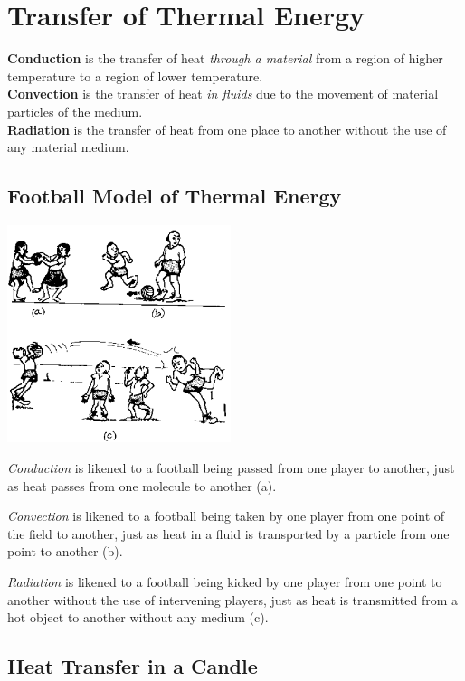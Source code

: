 \section{Transfer of Thermal Energy}

\textbf{Conduction} is the transfer of heat \emph{through a material} from a region of higher temperature to a region of lower temperature.\\
\textbf{Convection} is the transfer of heat \emph{in fluids} due to the movement of material particles of the medium.\\
\textbf{Radiation} is the transfer of heat from one place to another without the use of any material medium.

\begin{multicols}{2}


\subsection{Football Model of Thermal Energy}

\begin{center}
\includegraphics[width=0.49\textwidth]{./img/source/football-thermal.png}
\end{center}

\emph{Conduction} is likened to a football being passed from one player to another, just as heat passes from one molecule to another (a).

\emph{Convection} is likened to a football being taken by one player from one point of the field to another, just as heat in a fluid is transported by a particle from one point to another (b).

\emph{Radiation} is likened to a football being kicked by one player from one point to another without the use of intervening players, just as heat is transmitted from a hot object to another without any medium (c).

\subsection{Heat Transfer in a Candle}


\end{multicols}
